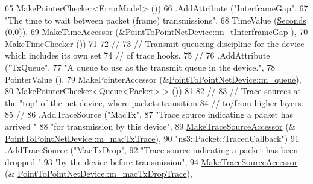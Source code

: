 \begin{DoxyCode}
65                    MakePointerChecker<ErrorModel> ())
66     .AddAttribute (\textcolor{stringliteral}{"InterframeGap"}, 
67                    \textcolor{stringliteral}{"The time to wait between packet (frame) transmissions"},
68                    TimeValue (\hyperlink{group__timecivil_ga33c34b816f8ff6628e33d5c8e9713b9e}{Seconds} (0.0)),
69                    MakeTimeAccessor (&\hyperlink{classns3_1_1PointToPointNetDevice_abb83cd1c35683a34deb50cb0e1bcf55d}{PointToPointNetDevice::m\_tInterframeGap}
      ),
70                    \hyperlink{group__time_ga7032965bd4afa578691d88c09e4481c1}{MakeTimeChecker} ())
71 
72     \textcolor{comment}{//}
73     \textcolor{comment}{// Transmit queueing discipline for the device which includes its own set}
74     \textcolor{comment}{// of trace hooks.}
75     \textcolor{comment}{//}
76     .AddAttribute (\textcolor{stringliteral}{"TxQueue"}, 
77                    \textcolor{stringliteral}{"A queue to use as the transmit queue in the device."},
78                    PointerValue (),
79                    MakePointerAccessor (&\hyperlink{classns3_1_1PointToPointNetDevice_accb023eb99ce542c5a33bb5e79b7c2eb}{PointToPointNetDevice::m\_queue}),
80                    \hyperlink{namespacens3_a8cd81c2f226bc23ad44a259717e6da15}{MakePointerChecker}<Queue<Packet> > ())
81 
82     \textcolor{comment}{//}
83     \textcolor{comment}{// Trace sources at the "top" of the net device, where packets transition}
84     \textcolor{comment}{// to/from higher layers.}
85     \textcolor{comment}{//}
86     .AddTraceSource (\textcolor{stringliteral}{"MacTx"}, 
87                      \textcolor{stringliteral}{"Trace source indicating a packet has arrived "}
88                      \textcolor{stringliteral}{"for transmission by this device"},
89                      \hyperlink{group__tracing_gab21a770b9855af4e8f69f7531ea4a6b0}{MakeTraceSourceAccessor} (&
      \hyperlink{classns3_1_1PointToPointNetDevice_a1f915201c9a40e6221a61477590ddfef}{PointToPointNetDevice::m\_macTxTrace}),
90                      \textcolor{stringliteral}{"ns3::Packet::TracedCallback"})
91     .AddTraceSource (\textcolor{stringliteral}{"MacTxDrop"}, 
92                      \textcolor{stringliteral}{"Trace source indicating a packet has been dropped "}
93                      \textcolor{stringliteral}{"by the device before transmission"},
94                      \hyperlink{group__tracing_gab21a770b9855af4e8f69f7531ea4a6b0}{MakeTraceSourceAccessor} (&
      \hyperlink{classns3_1_1PointToPointNetDevice_ae8c1d85f19dd5ae51c2ec0bde51f716d}{PointToPointNetDevice::m\_macTxDropTrace}),

\end{DoxyCode}
